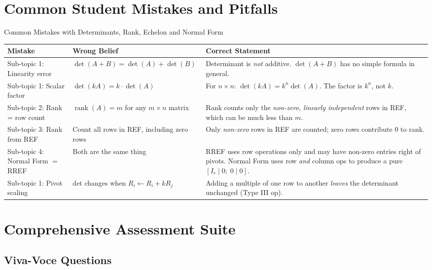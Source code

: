 \documentclass[12pt,a4paper]{article}
\begin{document}
\section{Common Student Mistakes and Pitfalls}

\begin{mistakebox}{Common Mistakes with Determinants, Rank, Echelon and Normal Form}
\begin{tabular}{@{}p{4.2cm}p{4.2cm}p{5.6cm}@{}}
\toprule
\textbf{Mistake} & \textbf{Wrong Belief} & \textbf{Correct Statement} \\
\midrule
Sub-topic 1: Linearity error
  & $\det(A+B)=\det(A)+\det(B)$
  & Determinant is \emph{not} additive. $\det(A+B)$ has no simple formula in general. \\[6pt]
Sub-topic 1: Scalar factor
  & $\det(kA)=k\cdot\det(A)$
  & For $n\times n$: $\det(kA)=k^n\det(A)$. The factor is $k^n$, not $k$. \\[6pt]
Sub-topic 2: Rank = row count
  & $\operatorname{rank}(A)=m$ for any $m\times n$ matrix
  & Rank counts only the \emph{non-zero, linearly independent} rows in REF, which can be much less than $m$. \\[6pt]
Sub-topic 3: Rank from REF
  & Count all rows in REF, including zero rows
  & Only \emph{non-zero} rows in REF are counted; zero rows contribute 0 to rank. \\[6pt]
Sub-topic 4: Normal Form $=$ RREF
  & Both are the same thing
  & RREF uses row operations only and may have non-zero entries right of pivots. Normal Form uses row \emph{and} column ops to produce a pure $[I_r \mid 0;\; 0\mid0]$. \\[6pt]
Sub-topic 1: Pivot scaling
  & det changes when $R_i \leftarrow R_i + kR_j$
  & Adding a multiple of one row to another \emph{leaves} the determinant unchanged (Type III op). \\
\bottomrule
\end{tabular}
\end{mistakebox}

\section{Comprehensive Assessment Suite}

\subsection*{Viva-Voce Questions}
\end{document}
